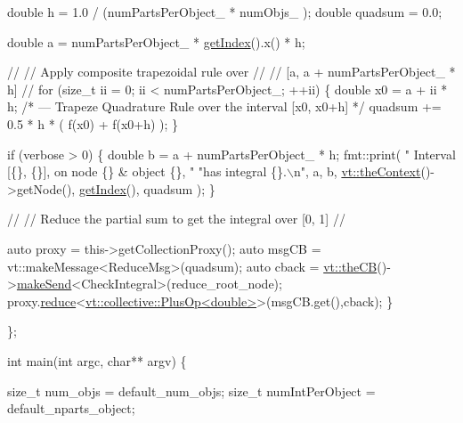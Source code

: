 \begin{DoxyCodeInclude}
    \textcolor{keywordtype}{double} h = 1.0 / (numPartsPerObject\_ * numObjs\_ );
    \textcolor{keywordtype}{double} quadsum = 0.0;

    \textcolor{keywordtype}{double} a = numPartsPerObject\_ * \hyperlink{namespacecheckpoint_1_1dispatch_1_1typeregistry_aa75ef84e9b63a687784360ded2d56fe4}{getIndex}().x() * h;

    \textcolor{comment}{//}
    \textcolor{comment}{// Apply composite trapezoidal rule over}
    \textcolor{comment}{//}
    \textcolor{comment}{// [a, a + numPartsPerObject\_ * h]}
    \textcolor{comment}{//}
    \textcolor{keywordflow}{for} (\textcolor{keywordtype}{size\_t} ii = 0; ii < numPartsPerObject\_; ++ii) \{
      \textcolor{keywordtype}{double} x0 = a + ii * h;
      \textcolor{comment}{/* --- Trapeze Quadrature Rule over the interval [x0, x0+h] */}
      quadsum += 0.5 * h * ( f(x0) + f(x0+h) );
    \}

    \textcolor{keywordflow}{if} (verbose > 0) \{
      \textcolor{keywordtype}{double} b = a + numPartsPerObject\_ * h;
      fmt::print(
        \textcolor{stringliteral}{" Interval [\{\}, \{\}], on node \{\} & object \{\}, "}
        \textcolor{stringliteral}{"has integral \{\}.\(\backslash\)n"}, a, b, \hyperlink{namespacevt_a26551fe0e6e6a1371111df5b12c7e92c}{vt::theContext}()->getNode(),
        \hyperlink{namespacecheckpoint_1_1dispatch_1_1typeregistry_aa75ef84e9b63a687784360ded2d56fe4}{getIndex}(), quadsum
      );
    \}

    \textcolor{comment}{//}
    \textcolor{comment}{// Reduce the partial sum to get the integral over [0, 1]}
    \textcolor{comment}{//}

    \textcolor{keyword}{auto} proxy = this->getCollectionProxy();
    \textcolor{keyword}{auto} msgCB = vt::makeMessage<ReduceMsg>(quadsum);
    \textcolor{keyword}{auto} cback = \hyperlink{namespacevt_a673b109e94c7bca58313504c83e1da94}{vt::theCB}()->\hyperlink{structvt_1_1pipe_1_1_pipe_manager_a73583be6260418b13ee66e56cdade2da}{makeSend}<CheckIntegral>(reduce\_root\_node);
    proxy.\hyperlink{structvt_1_1objgroup_1_1proxy_1_1_proxy_a61273d407174fb496b4aed10ec6650bd}{reduce}<\hyperlink{structvt_1_1collective_1_1reduce_1_1operators_1_1_plus_op}{vt::collective::PlusOp<double>}>(msgCB.get(),cback);
  \}

\};


\textcolor{keywordtype}{int} main(\textcolor{keywordtype}{int} argc, \textcolor{keywordtype}{char}** argv) \{

  \textcolor{keywordtype}{size\_t} num\_objs = default\_num\_objs;
  \textcolor{keywordtype}{size\_t} numIntPerObject = default\_nparts\_object;


\end{DoxyCodeInclude}
